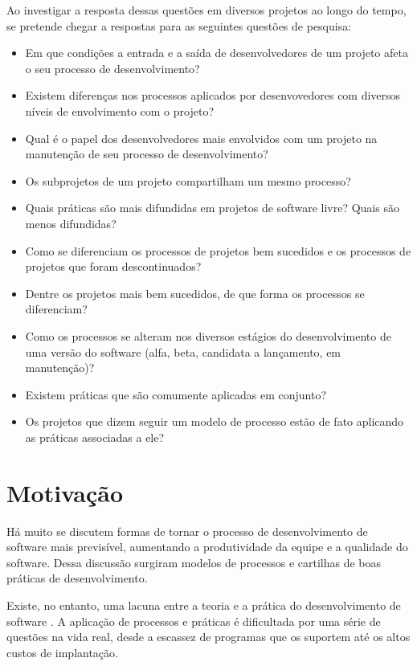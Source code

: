 \documentclass{article}
\begin{document}
Ao investigar a resposta dessas questões em diversos projetos ao longo do
tempo, se pretende chegar a respostas para as seguintes questões de pesquisa:

\begin{itemize}
  \item Em que condições a entrada e a saída de desenvolvedores de um projeto afeta o seu processo de desenvolvimento?
  \item Existem diferenças nos processos aplicados por desenvovedores com diversos níveis de envolvimento com o projeto?
  \item Qual é o papel dos desenvolvedores mais envolvidos com um projeto na manutenção de seu processo de desenvolvimento?
  \item Os subprojetos de um projeto compartilham um mesmo processo?
  \item Quais práticas são mais difundidas em projetos de software livre? Quais são menos difundidas?
  \item Como se diferenciam os processos de projetos bem sucedidos e os processos de projetos que foram descontinuados?
  \item Dentre os projetos mais bem sucedidos, de que forma os processos se diferenciam?
  \item Como os processos se alteram nos diversos estágios do desenvolvimento de uma versão do software (alfa, beta, candidata a lançamento, em manutenção)?
  \item Existem práticas que são comumente aplicadas em conjunto?
  \item Os projetos que dizem seguir um modelo de processo estão de fato aplicando as práticas associadas a ele?
\end{itemize}


\section{Motivação}

Há muito se discutem formas de tornar o processo de desenvolvimento de software
mais previsível, aumentando a produtividade da equipe e a qualidade do
software. Dessa discussão surgiram modelos de processos e cartilhas de boas
práticas de desenvolvimento.

Existe, no entanto, uma lacuna entre a teoria e a prática do
desenvolvimento de software \cite{glass1996}. A aplicação de processos e práticas é
dificultada por uma série de questões na vida real, desde a escassez de
programas que os suportem até os altos custos de implantação.
\end{document}
